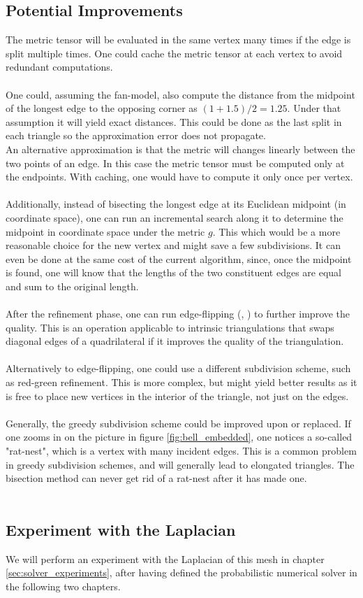 \subsection*{Potential Improvements}
The metric tensor will be evaluated in the same vertex many times if the edge is split multiple times. One could cache the metric tensor at each vertex to avoid redundant computations.
\\\\
One could, assuming the fan-model, also compute the distance from the midpoint of the longest edge to the opposing corner as $(1 + 1.5) / 2 = 1.25$. Under that assumption it will yield exact distances. This could be done as the last split in each triangle so the approximation error does not propagate.
\\ An alternative approximation is that the metric will changes linearly between the two points of an edge. In this case the metric tensor must be computed only at the endpoints. With caching, one would have to compute it only once per vertex.
\\\\ Additionally, instead of bisecting the longest edge at its Euclidean midpoint (in coordinate space), one can run an incremental search along it to determine the midpoint in coordinate space under the metric $g$. This which would be a more reasonable choice for the new vertex and might save a few subdivisions. It can even be done at the same cost of the current algorithm, since, once the midpoint is found, one will know that the lengths of the two constituent edges are equal and sum to the original length.
\\\\ After the refinement phase, one can run edge-flipping (\cite{sharp2021intrinsic}, \cite{intrinsic_laplacian}) to further improve the quality. This is an operation applicable to intrinsic triangulations that swaps diagonal edges of a quadrilateral if it improves the quality of the triangulation.
\\\\ Alternatively to edge-flipping, one could use a different subdivision scheme, such as red-green refinement. This is more complex, but might yield better results as it is free to place new vertices in the interior of the triangle, not just on the edges.
\\\\ Generally, the greedy subdivision scheme could be improved upon or replaced. If one zooms in on the picture in figure \ref{fig:bell_embedded}, one notices a so-called "rat-nest", which is a vertex with many incident edges. This is a common problem in greedy subdivision schemes, and will generally lead to elongated triangles. The bisection method can never get rid of a rat-nest after it has made one.
\\\\
\subsection*{Experiment with the Laplacian}
We will perform an experiment with the Laplacian of this mesh in chapter \ref{sec:solver_experiments}, after having defined the probabilistic numerical solver in the following two chapters.
\ifdefined\COMPILINGFROMMAIN
\else
    
\fi